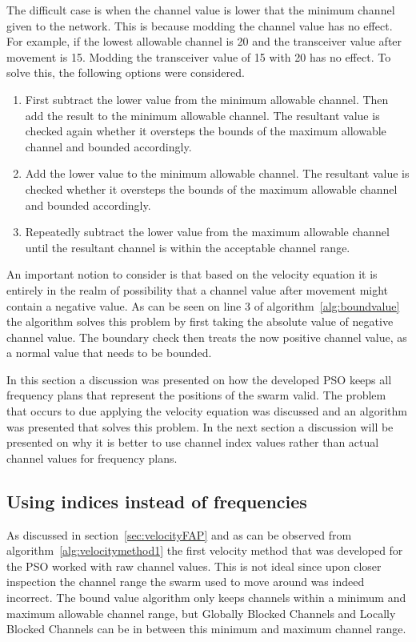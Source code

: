 The difficult case is when the channel value is lower that the minimum channel given to the network. This is because modding the channel value has no effect. For example, if the lowest allowable channel is 20 and the transceiver value after movement is 15.
Modding the transceiver value of 15 with 20 has no effect. To solve this, the following options were considered.

\begin{enumerate}
\item First subtract the lower value from the minimum allowable channel. Then add the result to the minimum allowable channel. The resultant value is checked again whether it oversteps the bounds of the maximum allowable channel and bounded accordingly.
\item Add the lower value to the minimum allowable channel. The resultant value is checked whether it oversteps the bounds of the maximum allowable channel and bounded accordingly.
\item Repeatedly subtract the lower value from the maximum allowable channel until the resultant channel is within the acceptable channel range.
\end{enumerate}

An important notion to consider is that based on the velocity equation it is entirely in the realm of possibility that a channel value after movement might contain a negative value. As can be seen on line 3 of algorithm~\ref{alg:boundvalue} the algorithm solves this problem by first taking the absolute value of negative channel value. The boundary check then treats the now positive channel value, as a normal value that needs to be bounded.

In this section a discussion was presented on how the developed PSO keeps all frequency plans that represent the positions of the swarm valid. The problem that occurs to due applying the velocity equation was discussed and an algorithm was presented that solves this problem. In the next section a discussion will be presented on why it is better to use channel index values rather than actual channel values for frequency plans. 
\subsection{Using indices instead of frequencies}

As discussed in section~\ref{sec:velocityFAP} and as can be observed from algorithm~\ref{alg:velocitymethod1} the first velocity method that was developed for the PSO worked with raw channel values. This is not ideal since upon closer inspection the channel range the swarm used to move around was indeed incorrect. The bound value algorithm only keeps channels within a minimum and maximum allowable channel range, but Globally Blocked Channels and Locally Blocked Channels can be in between this minimum and maximum channel range. 

